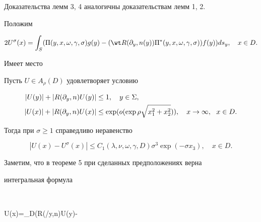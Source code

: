  


 


Доказательства лемм 3, 4 аналогичны доказательствам лемм 1, 2. 


Положим 


\begin{equation} 


2U^\sigma(x)=\int_S(\Pi(y,x,\omega,\gamma,\sigma)g(y)- 


(\wt R(\partial_y,n(y))\Pi^*(y,x,\omega,\gamma,\sigma)) 


f(y))ds_y,\quad x\in D. 


\end{equation} 


 


Имеет место 


 


 


\begin{thm} 


Пусть $U\in A_\rho(D)$ удовлетворяет условию 


\begin{align} 


|U(y)|+|R(\partial_y,n)U(y)|&\le1,\quad y\in\Sigma,\notag \\ 


% 


|U(x)|+|R(\partial_y,n)U(x)|&\le\exp(o(\exp\rho\sqrt{x^2_1+x^2_2})), 


\quad x\to\infty,\ \ x\in D. 


\end{align} 


Тогда при $\sigma\ge1$ справедливо неравенство 


$$ 


|U(x)-U^\sigma(x)|\le C_1(\lambda,\nu,\omega,\gamma,D) 


\sigma^3\exp(-\sigma x_3),\quad x\in D. 


$$ 


\end{thm} 


 


 


Заметим, что в теореме 5 при сделанных предположениях верна 


интегральная формула 


$$ 


U(x)=\int_{\partial D}(\Pi R(\partial/\partial y,n)U(y)- 


